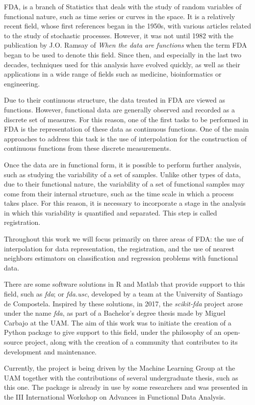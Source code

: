 
\ac{FDA}, is a branch of
Statistics that deals with the study of random variables of
functional nature, such as time series or curves in the
space. It is a relatively recent field, whose first references
began in the 1950s, with various articles related to the study of stochastic
processes. However, it was not until 1982 with the publication by
J.O. Ramsay of \textit{When the data are functions}\cite{Ramsay1982} when the
term \acs{FDA} began to be used to denote this field.
Since then, and especially in the last two decades, techniques used for this analysis
have evolved quickly, as well as their applications in a wide range of fields
such as medicine, bioinformatics or engineering.

Due to their continuous structure, the data treated in FDA are viewed as functions.
However, functional data are generally observed and recorded as a discrete set of
measures. For this reason, one of the first tasks to be performed in FDA is the
representation of these data as continuous functions.
One of the main approaches to address this task is the use of interpolation
for the construction of continuous functions from these discrete measurements.

Once the data are in functional form, it is possible to perform
further analysis, such as studying the variability of a set of samples.
Unlike other types of data, due to their functional nature, the variability of
a set of functional samples may come from their internal structure, such as the time scale
in which a process takes place. For this reason, it is necessary to
incorporate a stage in the analysis in which this variability is quantified
and separated. This step is called registration.

Throughout this work we will focus primarily on three areas of FDA:
the use of interpolation for data representation, the registration, and the use
of nearest neighbors estimators on classification and regression problems with
functional data.

There are some software solutions in R and Matlab that provide support to this
field, such as \textit{fda}\cite{fda-r}\cite{Ramsay2009};
or \textit{fda.usc}\cite{FdaUsc}, developed by a team at the
University of Santiago de Compostela.
Inspired by these solutions, in 2017, the \textit{scikit-fda} project arose
under the name \textit{fda}\cite{FDA2018}, as part of a Bachelor's degree thesis
made by Miguel Carbajo at the UAM. The aim of this work was to initiate the creation of a
Python package to give support to this field, under the philosophy of an open-source
project, along with the creation of a community that contributes to its development
and maintenance.

Currently, the project is being driven by the Machine
Learning Group at the UAM together with the contributions of several
undergraduate thesis, such as this one.
The package is already in use by some researchers and was presented
in the III International Workshop on Advances in Functional Data
Analysis\cite{ramos-carrenoScikitfdaPythonPackage2019}.
